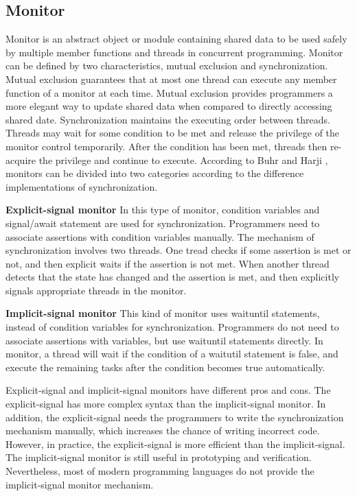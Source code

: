 \documentclass[preprint]{sigplanconf}
\begin{document}
\subsection{Monitor}
Monitor is an abstract object or module containing shared data to be used safely
by multiple member functions and threads in concurrent programming. Monitor can
be defined by two characteristics, mutual exclusion and synchronization. Mutual 
exclusion guarantees that at most one thread can execute any member function of 
a monitor at each time. Mutual exclusion provides programmers a more elegant
way to update shared data when compared to directly accessing shared date. 
Synchronization maintains the executing order between threads. Threads may wait
for some condition to be met and release the privilege of the monitor control 
temporarily. After the condition has been met, threads then re-acquire the 
privilege and continue to execute.
According to Buhr and Harji \cite{bh05}, monitors can be divided into two 
categories according to the difference implementations of synchronization. 
\begin{description}
    \item{\bf Explicit-signal monitor} In this type of monitor, condition
    variables and signal/await statement are used for synchronization. 
    Programmers need to
    associate assertions with condition variables manually. The mechanism of
    synchronization involves two threads. One tread checks if some
    assertion is met or not, and then explicit waits if the assertion is not
    met. When another thread detects that the state has changed and the 
    assertion is met, and then explicitly signals appropriate threads in the 
    monitor.
    \item{\bf Implicit-signal monitor} This kind of monitor uses waituntil
    statements, instead of condition variables for
    synchronization. Programmers do not need to associate assertions with
    variables, but use waituntil statements directly. In
    monitor, a thread will wait if the condition of a waitutil
    statement is false, and execute the remaining tasks after the condition 
    becomes true automatically.
\end{description}

Explicit-signal and implicit-signal monitors have different pros and cons. The 
explicit-signal has more complex syntax than the implicit-signal monitor. In 
addition, the explicit-signal needs the programmers to write the synchronization
mechanism manually, which increases the chance of writing incorrect code. 
However, in practice, the explicit-signal is more efficient than the implicit-signal. 
The implicit-signal monitor is still useful in prototyping and verification. 
Nevertheless, most of modern programming languages do not provide the 
implicit-signal monitor mechanism.
\end{document}
